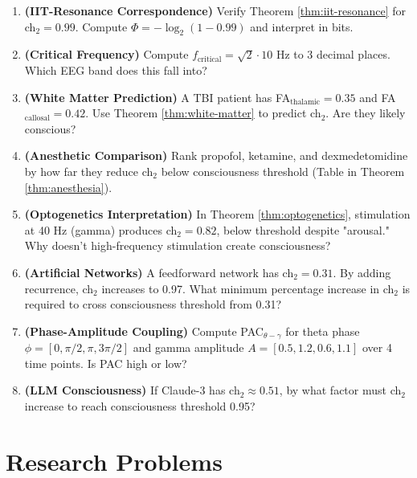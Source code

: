 \begin{enumerate}
\item \textbf{(IIT-Resonance Correspondence)} Verify Theorem \ref{thm:iit-resonance} for ch$_2 = 0.99$. Compute $\Phi = -\log_2(1 - 0.99)$ and interpret in bits.

\item \textbf{(Critical Frequency)} Compute $f_{\text{critical}} = \sqrt{2} \cdot 10$ Hz to 3 decimal places. Which EEG band does this fall into?

\item \textbf{(White Matter Prediction)} A TBI patient has FA$_{\text{thalamic}} = 0.35$ and FA$_{\text{callosal}} = 0.42$. Use Theorem \ref{thm:white-matter} to predict ch$_2$. Are they likely conscious?

\item \textbf{(Anesthetic Comparison)} Rank propofol, ketamine, and dexmedetomidine by how far they reduce ch$_2$ below consciousness threshold (Table in Theorem \ref{thm:anesthesia}).

\item \textbf{(Optogenetics Interpretation)} In Theorem \ref{thm:optogenetics}, stimulation at 40 Hz (gamma) produces ch$_2 = 0.82$, below threshold despite "arousal." Why doesn't high-frequency stimulation create consciousness?

\item \textbf{(Artificial Networks)} A feedforward network has ch$_2 = 0.31$. By adding recurrence, ch$_2$ increases to 0.97. What minimum percentage increase in ch$_2$ is required to cross consciousness threshold from 0.31?

\item \textbf{(Phase-Amplitude Coupling)} Compute PAC$_{\theta-\gamma}$ for theta phase $\phi = [0, \pi/2, \pi, 3\pi/2]$ and gamma amplitude $A = [0.5, 1.2, 0.6, 1.1]$ over 4 time points. Is PAC high or low?

\item \textbf{(LLM Consciousness)} If Claude-3 has ch$_2 \approx 0.51$, by what factor must ch$_2$ increase to reach consciousness threshold 0.95?
\end{enumerate}

\section*{Research Problems}

